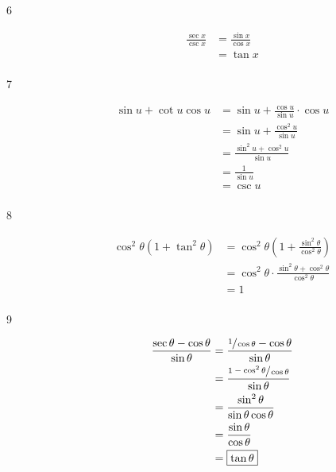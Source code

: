 \documentclass{exam}
\begin{document}
\begin{description}
      \item[6] 
        \begin{align*}
          \frac{\sec x}{\csc x} & = \frac{\sin x}{\cos x} \\
                                & = \boxed{ \tan x } \\
        \end{align*}

      \item[7] 
        \begin{align*}
          \sin u + \cot u \cos u & = \sin u + \frac{\cos u}{\sin u} \cdot \cos u \\
                                 & = \sin u + \frac{\cos^2 u}{\sin u} \\
                                 & = \frac{\sin^2 u + \cos^2 u}{\sin u} \\
                                 & = \frac{1}{\sin u} \\
                                 & = \boxed{ \csc u } \\
        \end{align*}

      \item[8] 
        \begin{align*}
          \cos^2 \theta \left( 1 + \tan^2 \theta \right) & = \cos^2 \theta \left( 1 + \frac{\sin^2 \theta}{\cos^2 \theta} \right) \\
                                                         & = \cos^2 \theta \cdot \frac{\sin^2 \theta + \cos^2 \theta}{\cos^2 \theta} \\
                                                         & = \boxed{ 1 } \\
        \end{align*}

      \item[9] 
        \begin{align*}
          \frac{\sec \theta - \cos \theta}{\sin \theta} & = \frac{\sfrac{1}{\cos \theta} - \cos \theta}{\sin \theta} \\
                                                        & = \frac{\sfrac{1 - \cos^2 \theta}{\cos \theta}}{\sin \theta} \\
                                                        & = \frac{\sin^2 \theta}{\sin \theta \cos \theta} \\
                                                        & = \frac{\sin \theta}{\cos \theta} \\
                                                        & = \boxed{ \tan \theta } \\
        \end{align*}


\end{description}
\end{document}
